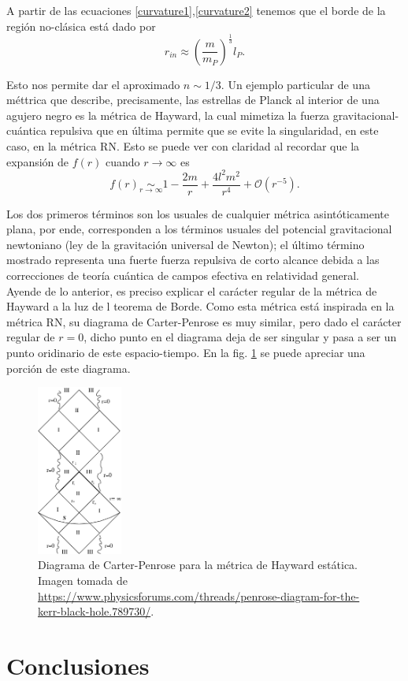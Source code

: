 \documentclass{article}
\numberwithin{equation}{section}
\theoremstyle{definition}
\begin{document}
A partir de las ecuaciones \eqref{curvature1},\eqref{curvature2} tenemos que el borde de la región no-clásica está dado por
\begin{equation*}
r_{in} \approx \left(\frac{m}{m_P}\right)^{\frac{1}{3}}l_P.
\end{equation*}

Esto nos permite dar el aproximado $n \sim 1/3$. Un ejemplo particular de una méttrica que describe, precisamente, las estrellas de Planck al interior de una agujero negro es la métrica de Hayward, la cual mimetiza la fuerza gravitacional-cuántica repulsiva que en última permite que se evite la singularidad, en este caso, en la métrica RN. Esto se puede ver con claridad al recordar que la expansión de $f(r)$ cuando $r \to \infty$ es
\begin{equation*}
f(r) \underset{r \to \infty}{\sim} 1 - \frac{2m}{r} + \frac{4l^2m^2}{r^4} + \mathcal{O}(r^{-5}).
\end{equation*}

Los dos primeros términos son los usuales de cualquier métrica asintóticamente plana, por ende, corresponden a los términos usuales del potencial gravitacional newtoniano (ley de la gravitación universal de Newton); el último término mostrado representa una fuerte fuerza repulsiva de corto alcance debida a las correcciones de teoría cuántica de campos efectiva en relatividad general.\\

Ayende de lo anterior, es preciso explicar el carácter regular de la métrica de Hayward a la luz de l teorema de Borde. Como esta métrica está inspirada en la métrica RN, su diagrama de Carter-Penrose es muy similar, pero dado el carácter regular de $r = 0$, dicho punto en el diagrama deja de ser singular y pasa a ser un punto oridinario de este espacio-tiempo. En la fig. \ref{fig: carter penrose diagram hayward} se puede apreciar una porción de este diagrama.
\begin{figure}[h!]
	\centering
	\includegraphics[width=0.25\textwidth,height=0.34\textheight]{CPDhayward}
	\caption{Diagrama de Carter-Penrose para la métrica de Hayward estática. Imagen tomada de \url{https://www.physicsforums.com/threads/penrose-diagram-for-the-kerr-black-hole.789730/}.}
	\label{fig: carter penrose diagram hayward}
\end{figure}

\newpage



\section{\label{conclusions} Conclusiones}

\newpage


\end{document}
